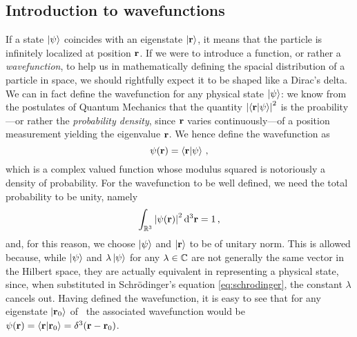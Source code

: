         \subsection{Introduction to wavefunctions}
            If a state $\ket{\psi}$ coincides with an eigenstate $\ket{\vb{r}}$, it means that the particle is infinitely localized at position $\vb{r}$. If we were to introduce a function, or rather a \emph{wavefunction}, to help us in mathematically defining the spacial distribution of a particle in space, we should rightfully expect it to be shaped like a Dirac's delta. We can in fact define the wavefunction for any physical state $\ket{\psi}$: we know from the postulates of Quantum Mechanics that the quantity $\abs{\braket{\vb{r}}{\psi}}^2$ is the proability---or rather the \emph{probability density}, since $\vb{r}$ varies continuously---of a position measurement yielding the eigenvalue $\vb{r}$. We hence define the wavefunction as
            \begin{equation}
                \label{eq:vavefunction}
                \psi\pqty{\vb{r}} = \braket{\vb{r}}{\psi}
                \mycomma
            \end{equation}
            which is a complex valued function whose modulus squared is notoriously a density of probability. For the wavefunction to be well defined, we need the total probability to be unity, namely 
            \begin{equation}
                \label{eq:normalization}
                \int\nolimits_{\bbR^3}\abs{\psi\pqty{\vb{r}}}^2 \dd[3]{\vb{r}} = 1
                \mycomma
            \end{equation}
            and, for this reason, we choose $\ket{\psi}$ and $\ket{\vb{r}}$ to be of unitary norm. This is allowed because, while $\ket{\psi}$ and $\lambda\ket{\psi}$ for any $\lambda\in\mathbb{C}$ are not generally the same vector in the Hilbert space, they are actually equivalent in representing a physical state, since, when substituted in Schr\"odinger's equation \eqref{eq:schrodinger}, the constant $\lambda$ cancels out. %
            Having defined the wavefunction, it is easy to see that for any eigenstate $\ket{\vb{r}_0}$ of \hvr\ the associated wavefunction would be $\psi\pqty{\vb{r}} = \braket{\vb{r}}{\vb{r}_0} = \delta^3\pqty{\vb{r} - \vb{r}_0}$.


